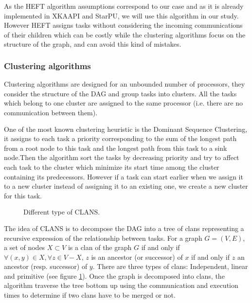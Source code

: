 \documentclass[10pt, conference, compsocconf]{IEEEtran}
\begin{document}
As the HEFT algorithm assumptions correspond to our case and as it is already
implemented in XKAAPI\cite{gautierxkaapi} and
StarPU\cite{augonnet2011starpu}, we will use this algorithm in our study.
However HEFT assigns tasks without considering the incoming communications of
their children which can be costly while the clustering algorithms focus on
the structure of the graph, and can avoid this kind of mistakes.

\subsubsection{Clustering algorithms} \label{sec:soa-sched-clust}

Clustering algorithms are designed for an unbounded number of processors, they
consider the structure of the DAG and group tasks into clusters. All the
tasks which belong to one cluster are assigned to the same processor (i.e. 
there are no communication between them).

One of the most known clustering heuristic is the Dominant Sequence
Clustering\cite{yang1994dsc}, it assigns to each task a priority corresponding
to the sum of the longest path from a root node to this task and the longest
path from this task to a sink node.Then the algorithm sort the tasks by
decreasing priority and try to affect each task to the cluster which minimize
its start time among the cluster containing its predecessors. However if a
task can start earlier when we assign it to a new cluster instead of assigning
it to an existing one, we create a new cluster for this task.

\begin{figure}[htb]
    \centering
    \caption{Different type of CLANS.}
    \label{fig:clans}
\end{figure}

The idea of CLANS
\cite{aubum1990efficient,mccreary1993partitioning,mccreary1993graph} is to
decompose the DAG into a tree of clans representing a recursive expression of
the relationship between tasks. For a graph $G=(V,E)$, a set of nodes
$X\subset V$ is a clan of the graph $G$ if and only if $\forall (x,y) \in X,
\forall z \in V-X$, $z$ is an ancestor (or successor) of $x$ if and only if
$z$ an ancestor (resp. successor) of $y$. There are three types of clans:
Independent, linear and primitive (see figure \ref{fig:clans}). Once the graph
is decomposed into clans, the algorithm traverse the tree bottom up using the
communication and execution times to determine if two clans have to be merged
or not.
\end{document}

